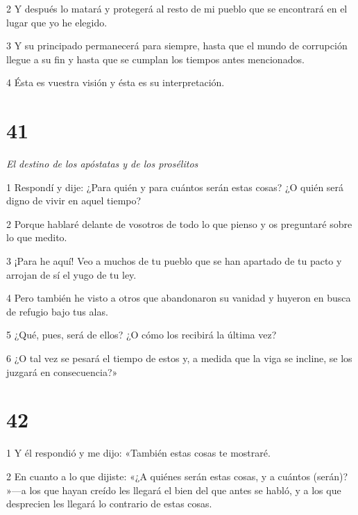 \par 2 Y después lo matará y protegerá al resto de mi pueblo que se encontrará en el lugar que yo he elegido.

\par 3 Y su principado permanecerá para siempre, hasta que el mundo de corrupción llegue a su fin y hasta que se cumplan los tiempos antes mencionados.

\par 4 Ésta es vuestra visión y ésta es su interpretación.


\chapter{41}

\par \textit{El destino de los apóstatas y de los prosélitos}

\par 1 Respondí y dije: ¿Para quién y para cuántos serán estas cosas? ¿O quién será digno de vivir en aquel tiempo?

\par 2 Porque hablaré delante de vosotros de todo lo que pienso y os preguntaré sobre lo que medito.

\par 3 ¡Para he aquí! Veo a muchos de tu pueblo que se han apartado de tu pacto y arrojan de sí el yugo de tu ley.

\par 4 Pero también he visto a otros que abandonaron su vanidad y huyeron en busca de refugio bajo tus alas.

\par 5 ¿Qué, pues, será de ellos? ¿O cómo los recibirá la última vez?

\par 6 ¿O tal vez se pesará el tiempo de estos y, a medida que la viga se incline, se los juzgará en consecuencia?»

\chapter{42}

\par 1 Y él respondió y me dijo: «También estas cosas te mostraré.

\par 2 En cuanto a lo que dijiste: «¿A quiénes serán estas cosas, y a cuántos (serán)? »—a los que hayan creído les llegará el bien del que antes se habló, y a los que desprecien les llegará lo contrario de estas cosas.

